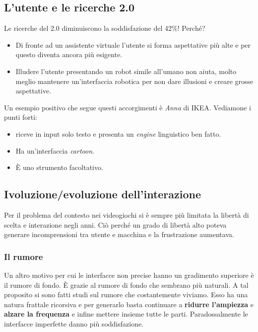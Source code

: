 		\subsection{L'utente e le ricerche 2.0}
			Le ricerche del 2.0 diminuiscono la soddisfazione del 42\%! Perché?
			\begin{itemize}
				\item Di fronte ad un assistente virtuale l'utente si forma aspettative più alte e per questo diventa ancora più esigente.
				\item Illudere l'utente presentando un robot simile all'umano non aiuta, molto meglio mantenere un'interfaccia robotica per non dare illusioni e creare grosse aspettative.
			\end{itemize}
			Un esempio positivo che segue questi accorgimenti è \emph{Anna} di IKEA. Vediamone i punti forti:
			\begin{itemize}
				\item riceve in input solo testo e presenta un \emph{engine} linguistico ben fatto. 
				\item Ha un'interfaccia \emph{cartoon}.
				\item È uno strumento facoltativo.
			\end{itemize}
		
		\subsection{Ivoluzione/evoluzione dell'interazione}
			Per il problema del contesto nei videogiochi si è sempre più limitata la libertà di scelta e interazione negli anni. Ciò perché un grado di libertà alto poteva generare incomprensioni tra utente e macchina e la frustrazione aumentava.
		
			\subsubsection{Il rumore}
				Un altro motivo per cui le interfacce non precise hanno un gradimento superiore è il rumore di fondo. È grazie al rumore di fondo che sembrano più naturali. A tal proposito si sono fatti studi sul rumore che costantemente viviamo. Esso ha una natura frattale ricorsiva e per generarlo basta continuare a \textbf{ridurre l'ampiezza} e \textbf{alzare la frequenza} e infine mettere insieme tutte le parti.
				Paradossalmente le interfacce imperfette danno più soddisfazione.